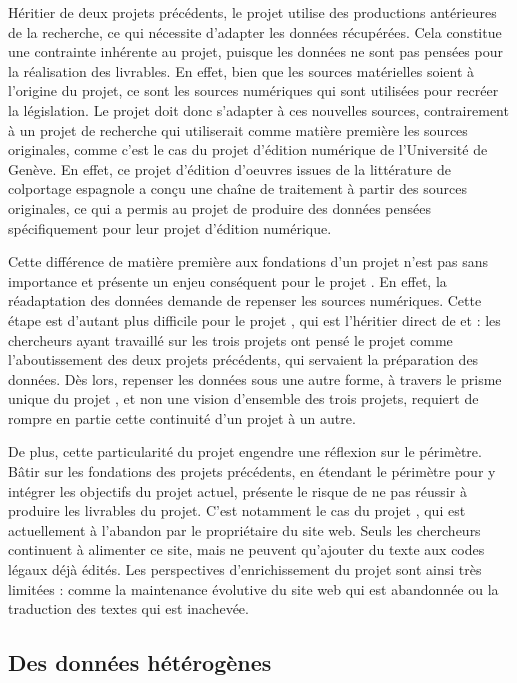 Héritier de deux projets précédents, le projet \COREL utilise des productions antérieures de la recherche, ce qui nécessite d'adapter les données récupérées. Cela constitue une contrainte inhérente au projet, puisque les données ne sont pas pensées pour la réalisation des livrables. En effet, bien que les sources matérielles soient à l'origine du projet, ce sont les sources numériques qui sont utilisées pour recréer la législation. Le projet doit donc s'adapter à ces nouvelles sources, contrairement à un projet de recherche qui utiliserait comme matière première les sources originales, comme c'est le cas du projet d'édition numérique \cordel de l'Université de Genève. En effet, ce projet d'édition d'oeuvres issues de la littérature de colportage espagnole a conçu une chaîne de traitement à partir des sources originales, ce qui a permis au projet de produire des données pensées spécifiquement pour leur projet d'édition numérique. 

Cette différence de matière première aux fondations d'un projet n'est pas sans importance et présente un enjeu conséquent pour le projet \COREL. En effet, la réadaptation des données demande de repenser les sources numériques. Cette étape est d'autant plus difficile pour le projet \COREL, qui est l'héritier direct de \LSC et \EPJ : les chercheurs ayant travaillé sur les trois projets ont pensé le projet \COREL comme l'aboutissement des deux projets précédents, qui servaient la préparation des données. Dès lors, repenser les données sous une autre forme, à travers le prisme unique du projet \COREL, et non une vision d'ensemble des trois projets, requiert de rompre en partie cette continuité d'un projet à un autre. 

De plus, cette particularité du projet \COREL engendre une réflexion sur le périmètre. Bâtir sur les fondations des projets précédents, en étendant le périmètre pour y intégrer les objectifs du projet actuel, présente le risque de ne pas réussir à produire les livrables du projet. C'est notamment le cas du projet \LSC, qui est actuellement à l'abandon par le propriétaire du site web. Seuls les chercheurs continuent à alimenter ce site, mais ne peuvent qu'ajouter du texte aux codes légaux déjà édités. Les perspectives d'enrichissement du projet \LSC sont ainsi très limitées : comme la maintenance évolutive du site web qui est abandonnée ou la traduction des textes qui est inachevée. 

\subsection{Des données hétérogènes}

